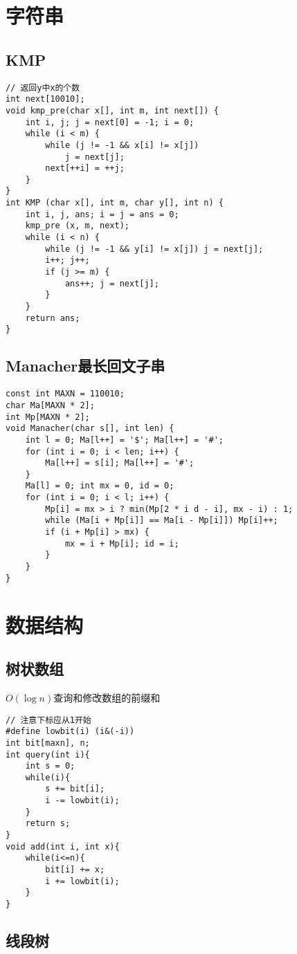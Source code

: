 \documentclass[a4paper]{article}
\begin{document}
\section{字符串}
\subsection{KMP}
\begin{lstlisting}
// 返回y中x的个数
int next[10010];
void kmp_pre(char x[], int m, int next[]) {
    int i, j; j = next[0] = -1; i = 0;
    while (i < m) {
        while (j != -1 && x[i] != x[j])
            j = next[j];
        next[++i] = ++j;
    }
}
int KMP (char x[], int m, char y[], int n) {
    int i, j, ans; i = j = ans = 0;
    kmp_pre (x, m, next);
    while (i < n) {
        while (j != -1 && y[i] != x[j]) j = next[j];
        i++; j++;
        if (j >= m) {
            ans++; j = next[j];
        }
    }
    return ans;
}
\end{lstlisting}
\subsection{Manacher最长回文子串}
\begin{lstlisting}
const int MAXN = 110010;
char Ma[MAXN * 2];
int Mp[MAXN * 2];
void Manacher(char s[], int len) {
    int l = 0; Ma[l++] = '$'; Ma[l++] = '#';
    for (int i = 0; i < len; i++) {
        Ma[l++] = s[i]; Ma[l++] = '#';
    }
    Ma[l] = 0; int mx = 0, id = 0;
    for (int i = 0; i < l; i++) {
        Mp[i] = mx > i ? min(Mp[2 * i d - i], mx - i) : 1;
        while (Ma[i + Mp[i]] == Ma[i - Mp[i]]) Mp[i]++;
        if (i + Mp[i] > mx) {
            mx = i + Mp[i]; id = i;
        }
    }
}
\end{lstlisting}
\clearpage
\section{数据结构}
\subsection{树状数组}
$O(\log n)$查询和修改数组的前缀和\begin{lstlisting}
// 注意下标应从1开始
#define lowbit(i) (i&(-i))
int bit[maxn], n; 
int query(int i){
	int s = 0;
	while(i){
		s += bit[i];
		i -= lowbit(i);
	}
	return s;
}
void add(int i, int x){
	while(i<=n){
		bit[i] += x;
		i += lowbit(i);
	}
}
\end{lstlisting}
\subsection{线段树}
\end{document}
